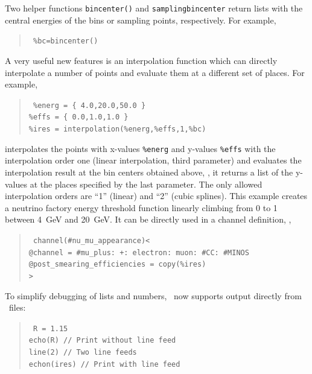 Two helper functions {\tt bincenter()} 
 and {\tt samplingbincenter}  return lists with the central energies of the bins or sampling points, respectively. For example,
\begin{quote}
{\tt
 \%bc=bincenter() 
}
\end{quote}
A very useful new features is an interpolation function which can directly interpolate a number of
points and evaluate them at a different set of places. For example,
\begin{quote}
{\tt
 \%energ = \{ 4.0,20.0,50.0 \} \\
 \%effs = \{ 0.0,1.0,1.0 \} \\
 \%ires = interpolation(\%energ,\%effs,1,\%bc) 
}
\end{quote}
interpolates the points with x-values {\tt \%energ} and y-values {\tt \%effs} with the interpolation order one (linear interpolation, third parameter) and evaluates the interpolation result at the bin centers obtained above, \ie, it returns a list of the y-values at the places specified by the last parameter. The only allowed interpolation orders are ``1'' (linear) and ``2'' (cubic splines). This example creates
a neutrino factory energy threshold function linearly climbing from 0 to 1 between 4~GeV and 20~GeV. It can be directly used in a channel definition, \eg, 
\begin{quote}
{\tt
 channel(\#nu\_mu\_appearance)< \\
\hspace*{0.5cm}	@channel = \#mu\_plus: +: electron: muon: \#CC: \#MINOS\ \\
\hspace*{0.5cm}	@post\_smearing\_efficiencies = copy(\%ires) \\
>
}
\end{quote}


To simplify debugging of lists and numbers, \GLOBES\ now supports output directly
from \AEDL\ files:
\begin{quote}
{\tt 
 R = 1.15 \\
 echo(R) // Print without line feed \\
 line(2) // Two line feeds \\
 echon(ires) // Print with line feed 
}
\end{quote}



